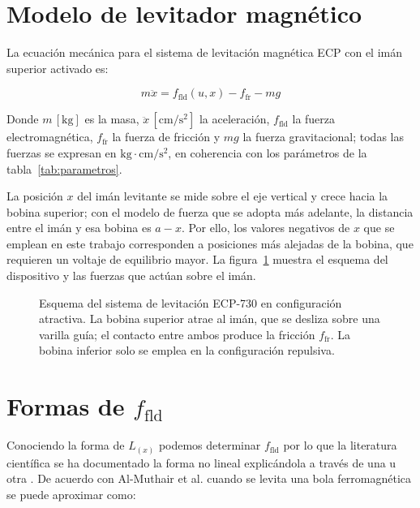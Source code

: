 \section{Modelo de levitador magnético}

La ecuación mecánica para el sistema de levitación magnética ECP \cite{730} con el imán superior activado es:

\begin{equation}
m\ddot{x} = f_{\text{fld}}(u,x) - f_{\text{fr}} - mg
\label{eq:mec}
\end{equation}

Donde \( m \,[\text{kg}] \) es la masa, \( \ddot{x} \,[\text{cm}/\text{s}^2] \) la aceleración,
 \( f_{\text{fld}} \) la fuerza electromagnética, \( f_{\text{fr}} \) la fuerza de fricción y \( mg \) la fuerza gravitacional; todas las fuerzas se expresan en $\text{kg}\cdot\text{cm}/\text{s}^2$, en coherencia con los parámetros de la tabla~\ref{tab:parametros}.

La posición $x$ del imán levitante se mide sobre el eje vertical y crece hacia la bobina superior; con el modelo de fuerza que se adopta más adelante, la distancia entre el imán y esa bobina es $a-x$. Por ello, los valores negativos de $x$ que se emplean en este trabajo corresponden a posiciones más alejadas de la bobina, que requieren un voltaje de equilibrio mayor. La figura~\ref{fig:dispositivo} muestra el esquema del dispositivo y las fuerzas que actúan sobre el imán.

\begin{figure}[ht]
    \centering
    
    \caption[Esquema del ECP-730 en configuración atractiva]{Esquema del sistema de levitación ECP-730 en configuración atractiva. La bobina superior atrae al imán, que se desliza sobre una varilla guía; el contacto entre ambos produce la fricción $f_{\text{fr}}$. La bobina inferior solo se emplea en la configuración repulsiva.}
    \label{fig:dispositivo}
\end{figure}

\section{\texorpdfstring{Formas de $f_{\text{fld}}$}{Formas de fld}}

Conociendo la forma de $L_{(x)}$ podemos determinar $f_{\text{fld}}$ por lo que la literatura científica se ha documentado la forma no lineal explicándola a través de una u otra . De acuerdo con Al-Muthair et al. \cite{al} cuando se levita una bola ferromagnética se puede aproximar como:

